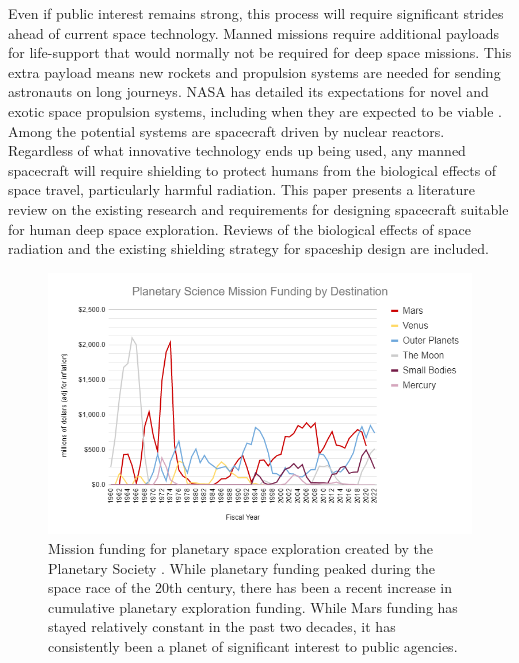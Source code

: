Even if public interest remains strong, this process will require significant strides ahead of current space technology. Manned missions require additional payloads for life-support that would normally not be required for deep space missions. This extra payload means new rockets and propulsion systems are needed for sending astronauts on long journeys. NASA has detailed its expectations for novel and exotic space propulsion systems, including when they are expected to be viable \cite{nasa-propulsion}. Among the potential systems are spacecraft driven by nuclear reactors. Regardless of what innovative technology ends up being used, any manned spacecraft will require shielding to protect humans from the biological effects of space travel, particularly harmful radiation. This paper presents a literature review on the existing research and requirements for designing spacecraft suitable for human deep space exploration. Reviews of the biological effects of space radiation and the existing shielding strategy for spaceship design are included.

\begin{figure}
\centering
\includegraphics[width=\linewidth]{mars-budget.png}
\caption{Mission funding for planetary space exploration created by the Planetary Society \cite{planetary-society}. While planetary funding peaked during the space race of the 20th century, there has been a recent increase in cumulative planetary exploration funding. While Mars funding has stayed relatively constant in the past two decades, it has consistently been a planet of significant interest to public agencies.}
\label{fig:budget}
\end{figure}

